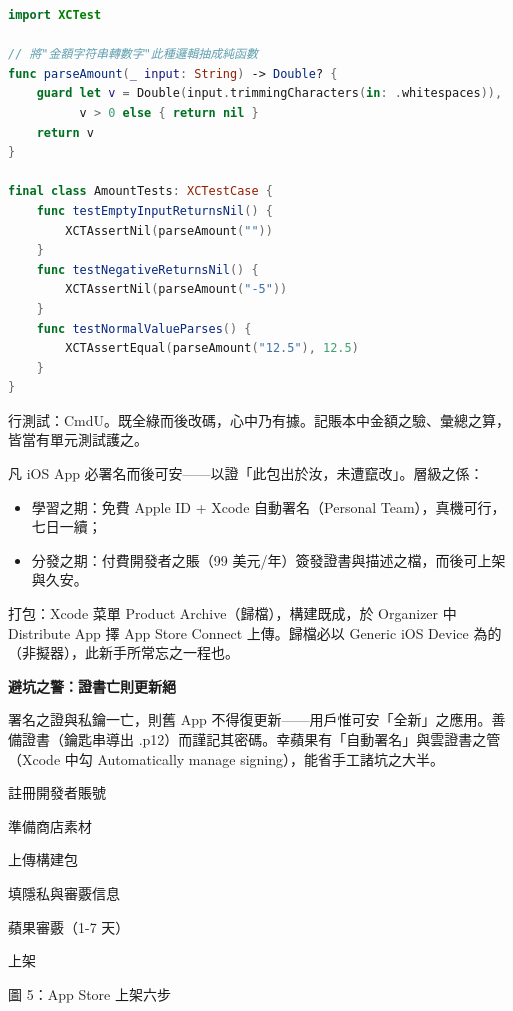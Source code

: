 \begin{lstlisting}[language=Swift]
import XCTest

// 將"金額字符串轉數字"此種邏輯抽成純函數
func parseAmount(_ input: String) -> Double? {
    guard let v = Double(input.trimmingCharacters(in: .whitespaces)),
          v > 0 else { return nil }
    return v
}

final class AmountTests: XCTestCase {
    func testEmptyInputReturnsNil() {
        XCTAssertNil(parseAmount(""))
    }
    func testNegativeReturnsNil() {
        XCTAssertNil(parseAmount("-5"))
    }
    func testNormalValueParses() {
        XCTAssertEqual(parseAmount("12.5"), 12.5)
    }
}
\end{lstlisting}

行測試：CmdU。既全綠而後改碼，心中乃有據。記賬本中金額之驗、彙總之算，皆當有單元測試護之。


凡 iOS App 必署名而後可安——以證「此包出於汝，未遭竄改」。層級之係：

\begin{itemize}
  \item 學習之期：免費 Apple ID + Xcode 自動署名（Personal Team），真機可行，七日一續；
  \item 分發之期：付費開發者之賬（99 美元/年）簽發證書與描述之檔，而後可上架與久安。
\end{itemize}

打包：Xcode 菜單 Product Archive（歸檔），構建既成，於 Organizer 中 Distribute App 擇 App Store Connect 上傳。歸檔必以 Generic iOS Device 為的（非擬器），此新手所常忘之一程也。

\textbf{避坑之警：證書亡則更新絕}\par

署名之證與私鑰一亡，則舊 App 不得復更新——用戶惟可安「全新」之應用。善備證書（鑰匙串導出 .p12）而謹記其密碼。幸蘋果有「自動署名」與雲證書之管（Xcode 中勾 Automatically manage signing），能省手工諸坑之大半。


註冊開發者賬號

準備商店素材

上傳構建包

填隱私與審覈信息

蘋果審覈（1-7 天）

上架

\begin{center}\small\color{gray}圖 5：App Store 上架六步\end{center}

